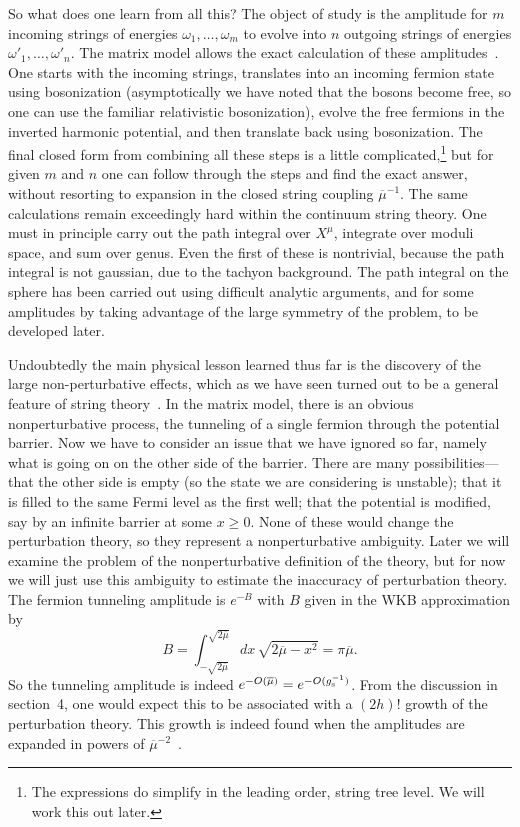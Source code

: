 So what does one learn from all this? 
The object of study is the amplitude for $m$
incoming strings of energies $\omega_1, \ldots, \omega_m$ to evolve
into $n$ outgoing strings of energies $\omega'_1, \ldots,
\omega'_n$.
The matrix model allows
the exact calculation of these amplitudes~\cite{MPR}.  One starts with
the incoming strings, translates into an incoming fermion state
using bosonization (asymptotically we have noted that the bosons
become free, so one can use the familiar relativistic bosonization),
evolve the free fermions in the inverted harmonic potential, and
then translate back using bosonization.  The final closed form
from combining all these steps is a little
complicated,\footnote{The
expressions do simplify in the leading order, string tree level.
We will work this out later.} 
but for given $m$ and $n$ one can follow through the
steps and find the exact answer, without resorting to expansion
in the closed string coupling $\overline{\mu}^{-1}$.
The same calculations remain
exceedingly hard within the continuum string theory.  One must in
principle carry out the path integral over $X^\mu$, integrate over
moduli space, and sum over genus.  Even the first of these is
nontrivial, because the path integral is not gaussian, due to the
tachyon background.  The path integral on the sphere has been carried
out using difficult analytic arguments, and for some amplitudes by
taking advantage of the large symmetry of the problem, to be
developed later.

Undoubtedly the main physical lesson learned thus far is the
discovery of the large non-perturbative effects, which as we have
seen turned out to be a general feature of string theory~\cite{Slo}. 
In the matrix model, there is an obvious nonperturbative process, the
tunneling of a single fermion through the potential barrier.  Now
we have to consider an issue that we have ignored so far, namely
what is going on on the other side of the barrier. There are many
possibilities---that the other side is empty (so the state we are
considering is unstable); that it is filled to the same Fermi
level as the first well; that the potential is modified,
say by an infinite barrier at some $x \geq 0$.  None of these
would change the perturbation theory, so they represent a
nonperturbative ambiguity.  Later we will examine the problem of
the nonperturbative definition of the theory, but for now we will
just use this ambiguity to estimate the inaccuracy of perturbation
theory.  The fermion tunneling amplitude is $e^{-B}$ with $B$ given
in the WKB approximation by
\begin{equation}
B = \int_{-\sqrt{2\overline\mu}}^{\sqrt{2\overline\mu}} dx\,
\sqrt{2\overline\mu - x^2} = \pi\overline\mu.
\end{equation}
So the tunneling amplitude is indeed $e^{-O(\overline\mu)} =
e^{-O(g_{\rm s}^{-1})}$.  From the discussion in section~4, one
would expect this to be associated with a $(2h)!$ growth of the
perturbation theory.  This growth is indeed found when the
amplitudes are expanded in powers of $\overline\mu^{-2}$~\cite{c1refs}.

